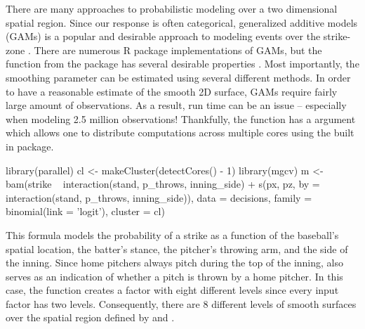 \begin{article}
There are many approaches to probabilistic modeling over a two dimensional
spatial region. Since our response is often categorical, generalized
additive models (GAMs) is a popular and desirable approach to modeling
events over the strike-zone \citep{loess}. There are numerous R package
implementations of GAMs, but the  function from the 
package has several desirable properties \citep{mgcv}. Most importantly,
the smoothing parameter can be estimated using several different methods.
In order to have a reasonable estimate of the smooth 2D surface, GAMs
require fairly large amount of observations. As a result, run time
can be an issue -- especially when modeling 2.5 million observations!
Thankfully, the  function has a  argument
which allows one to distribute computations across multiple cores
using the built in  package.
%
\begin{Schunk}
\begin{Sinput}
library(parallel) 
cl <- makeCluster(detectCores() - 1)
library(mgcv) 
m <- bam(strike ~ interaction(stand, p_throws, inning_side) +                
  s(px, pz, by = interaction(stand, p_throws, inning_side)),              
  data = decisions, family = binomial(link = 'logit'), cluster = cl)
\end{Sinput}
\end{Schunk}
%
This formula models the probability of a strike as a function of the
baseball's spatial location, the batter's stance, the pitcher's throwing
arm, and the side of the inning. Since home pitchers always pitch
during the top of the inning,  also serves as
an indication of whether a pitch is thrown by a home pitcher. In this
case, the  function creates a factor with eight
different levels since every input factor has two levels. Consequently,
there are 8 different levels of smooth surfaces over the spatial region
defined by  and .


\end{article}
